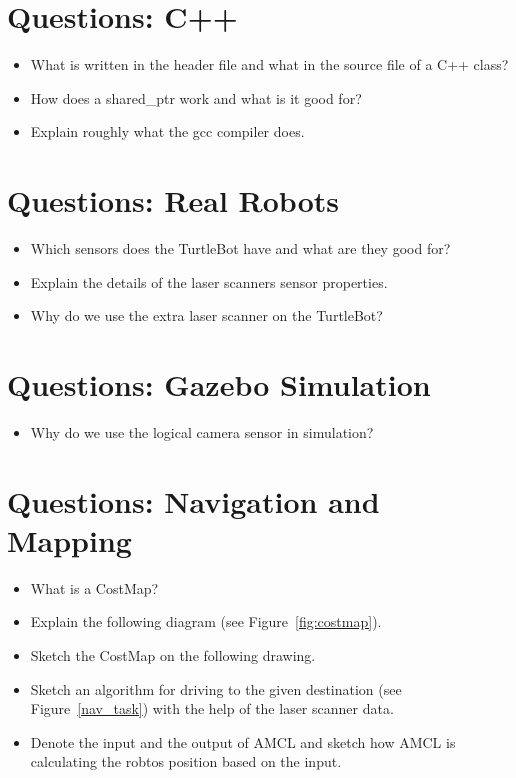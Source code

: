 \section{Questions: C++}
\label{sec:questions_c++}

\begin{itemize}
 \item What is written in the header file and what in the source file of a C++ class?
 \item How does a shared\_ptr work and what is it good for?
 \item Explain roughly what the gcc compiler does.
\end{itemize}

\section{Questions: Real Robots}
\label{sec:questions_robots}

\begin{itemize}
 \item Which sensors does the TurtleBot have and what are they good for?
 \item Explain the details of the laser scanners sensor properties.
 \item Why do we use the extra laser scanner on the TurtleBot?
\end{itemize}

\section{Questions: Gazebo Simulation}
\label{sec:questions_simulation}

\begin{itemize}
 \item Why do we use the logical camera sensor in simulation?
\end{itemize}

\section{Questions: Navigation and Mapping}
\label{sec:questions_nav_and_map}

\begin{itemize}
 \item What is a CostMap?
 \item Explain the following diagram (see Figure~\ref{fig:costmap}).
 \item Sketch the CostMap on the following drawing.
 \item Sketch an algorithm for driving to the given destination (see Figure~\ref{nav_task}) with the help of the laser scanner data.
 \item Denote the input and the output of AMCL and sketch how AMCL is calculating the robtos position based on the input.
\end{itemize}

